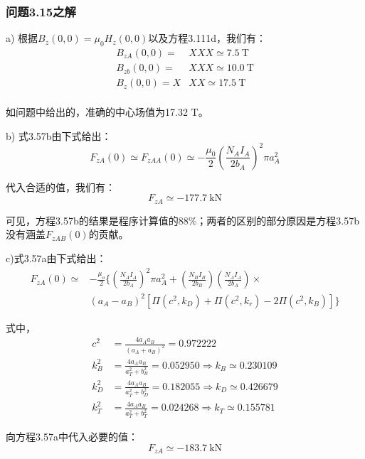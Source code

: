 \subsubsection{问题3.15之解}
a) 根据$B_z(0,0)=\mu_0H_z(0, 0)$以及方程3.111d，我们有：
\begin{align*}
B_{zA}(0,0)=&XXX\simeq 7.5\ \mathrm{T}\\
B_{zb}(0,0)=&XXX\simeq 10.0\ \mathrm{T}\\
B_{z}(0,0)=X&XX\simeq 17.5\ \mathrm{T}\\
\end{align*}

如问题中给出的，准确的中心场值为17.32 T。

b) 式3.57b由下式给出：
\begin{equation*}
F_{zA}(0)\simeq F_{zAA}(0)\simeq-\frac{\mu_{0}}{2}(\frac{N_{A}I_{A}}{2b_{A}})^{2}\pi a_{A}^{2}\tag{3.57b}%
\end{equation*}

代入合适的值，我们有：
\begin{equation*}
F_{zA}\simeq -177.7\ \mathrm{kN}
\end{equation*}

可见，方程3.57b的结果是程序计算值的88\%；两者的区别的部分原因是方程3.57b没有涵盖$F_{zAB}(0)$的贡献。 

c)式3.57a由下式给出：
\begin{equation*}
\begin{split}
F_{zA}(0)\simeq&-\frac{\mu_{o}}{2}\{(\frac{N_{A}I_{A}}{2b_{A}})^{2}\pi a_{A}^{2}+(\frac{N_{B}I_{B}}{2b_{B}})(\frac{N_{A}I_{A}}{2b_{A}})\times\\
&(a_{A}-a_{B})^{2}[\Pi(c^{2},k_{D})+\Pi(c^{2},k_{r})-2\Pi(c^{2},k_{B})]\}
\end{split}\tag{3.57a}
\end{equation*}

式中，
\begin{align*}
c^2&= \frac{4a_A a_B}{(a_A+a_B)^2}=0.972222\\
k_B^2&=\frac{4a_A a_B}{a_T^2+b_B^2}=0.052950\Rightarrow k_B\simeq 0.230109\\
k_D^2&=\frac{4a_A a_B}{a_T^2+b_D^2}=0.182055\Rightarrow k_D\simeq 0.426679\\
k_T^2&=\frac{4a_A a_B}{a_T^2+b_T^2}=0.024268\Rightarrow k_T\simeq 0.155781
\end{align*}

向方程3.57a中代入必要的值：
\begin{equation*}
F_{zA}\simeq -183.7\ \mathrm{kN}
\end{equation*}

